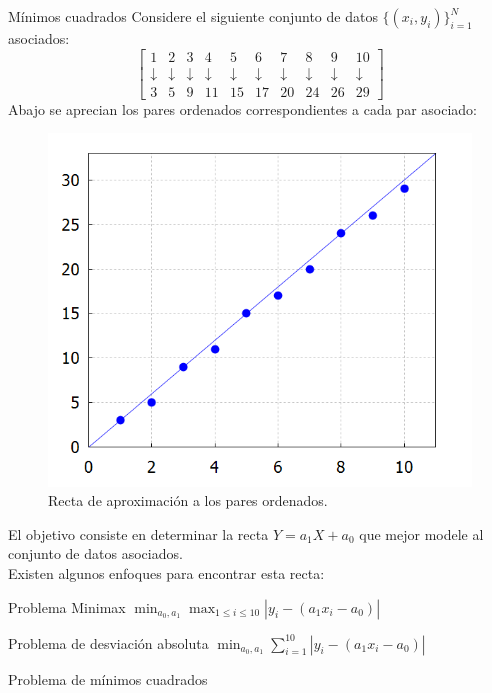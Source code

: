 \begin{frame}[allowframebreaks]{Mínimos cuadrados}
Considere el siguiente conjunto de datos $\{(x_i,y_i)\}_{i=1}^{N}$ asociados:
\begin{displaymath}
\begin{bmatrix}
1&2&3&4&5&6&7&8&9&10\\
\downarrow &\downarrow &\downarrow &\downarrow &\downarrow &\downarrow &\downarrow &\downarrow &\downarrow &\downarrow\\
3&5&9&11&15&17&20&24&26&29
\end{bmatrix}
\end{displaymath}
Abajo se aprecian los pares ordenados correspondientes a cada par asociado:
\begin{figure}[H]
\includegraphics[scale=0.55]{Imagen2}
\caption{Recta de aproximación a los pares ordenados.}
\end{figure}
\indent El objetivo consiste en determinar la recta $Y=a_1X+a_0$ que mejor modele al conjunto de datos asociados.\\
\indent Existen algunos enfoques para encontrar esta recta:
\begin{block}{Problema Minimax}
\centering $\displaystyle \min_{a_0,a_1}\max_{1\leq i\leq 10}|y_i-(a_1x_i-a_0)|$
\end{block}
\begin{block}{Problema de desviación absoluta}
\centering $\displaystyle \min_{a_0,a_1}\sum_{i=1}^{10}|y_i-(a_1x_i-a_0)|$
\end{block}
\begin{block}{Problema de mínimos cuadrados}

\end{block}
\end{frame}
